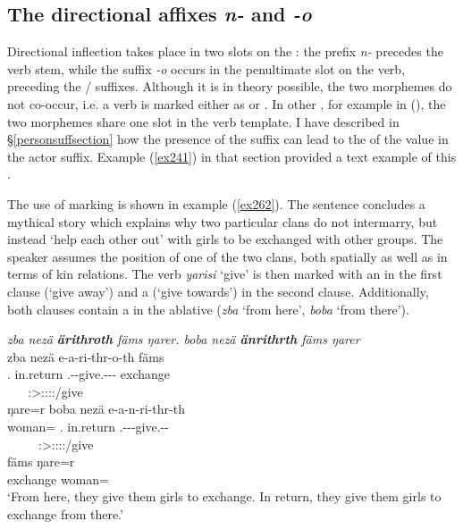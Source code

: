 \subsection{The directional affixes \emph{n-} and \emph{-o}} \label{directionalinflection}

Directional inflection takes place in two slots on the : the  prefix \emph{n-} precedes the verb stem, while the  suffix \emph{-o} occurs in the penultimate slot on the verb, preceding the / suffixes. Although it is in theory possible, the two morphemes do not co-occur, i.e. a verb is marked either as  or . In other , for example in  (\citealt{Evans:2015to}), the two morphemes share one slot in the verb template. I have described in {{\S}\ref{personsuffsection}} how the presence of the  suffix can lead to the  of the  value in the actor suffix. Example (\ref{ex241}) in that section provided a text example of this .

The use of  marking is shown in example (\ref{ex262}). The sentence concludes a mythical story which explains why two particular clans do not intermarry, but instead `help each other out' with girls to be exchanged with other groups. The speaker assumes the position of one of the two clans, both spatially as well as in terms of kin relations. The verb \emph{yarisi} `give' is then marked with an  in the first clause (`give away') and a  (`give towards') in the second clause. Additionally, both clauses contain a  in the ablative  (\emph{zba} `from here', \emph{boba} `from there').

\begin{exe}
	\ex \emph{zba nezä \textbf{ärithroth} fäms ŋarer. boba nezä \textbf{änrithrth} fäms ŋarer}\\
	\glll zba nezä e-a-ri-thr-o-th fäms\\
	\Prox.{\Abl} in.return \Stnsg.\Alph-\Vc-give.\Ext-\Ndu-\Andat-{\Nsg} exchange\\
	~ ~ {\footnotesize \Pl:\Sbj>\Stpl:\Io:\Nonpast:\Ipfv:\Andat/give} ~\\
	\sn
	\glll ŋare=r boba nezä e-a-n-ri-thr-th\\
	woman={\Purp} \Med.{\Abl} {in.return} \Stnsg.\Alph-\Vc-\Venit-give.\Ext-\Ndu-\Stnsg{}\\
	~ ~ ~ {\footnotesize \Stpl:\Sbj>\Stpl:\Io:\Nonpast:\Ipfv:\Venit/give} ~ ~\\
	\sn
	\gll fäms ŋare=r\\
	exchange woman={\Purp}\\
	\trans `From here, they give them girls to exchange. In return, they give them girls to exchange from there.' 
	\label{ex262}
\end{exe}

